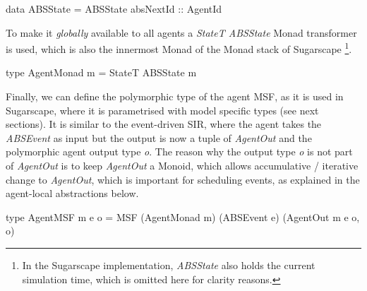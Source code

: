 \begin{HaskellCode}
data ABSState = ABSState { absNextId :: AgentId }
\end{HaskellCode}

To make it \textit{globally} available to all agents a \textit{StateT ABSState} Monad transformer is used, which is also the innermost Monad of the Monad stack of Sugarscape \footnote{In the Sugarscape implementation, \textit{ABSState} also holds the current simulation time, which is omitted here for clarity reasons.}.

\begin{HaskellCode}
type AgentMonad m = StateT ABSState m
\end{HaskellCode}

Finally, we can define the polymorphic type of the agent MSF, as it is used in Sugarscape, where it is parametrised with model specific types (see next sections). It is similar to the event-driven SIR, where the agent takes the \textit{ABSEvent} as input but the output is now a tuple of \textit{AgentOut} and the polymorphic agent output type \textit{o}. The reason why the output type \textit{o} is not part of \textit{AgentOut} is to keep \textit{AgentOut} a Monoid, which allows accumulative / iterative change to \textit{AgentOut}, which is important for scheduling events, as explained in the agent-local abstractions below.

\begin{HaskellCode}
type AgentMSF m e o = MSF (AgentMonad m) (ABSEvent e) (AgentOut m e o, o)
\end{HaskellCode}